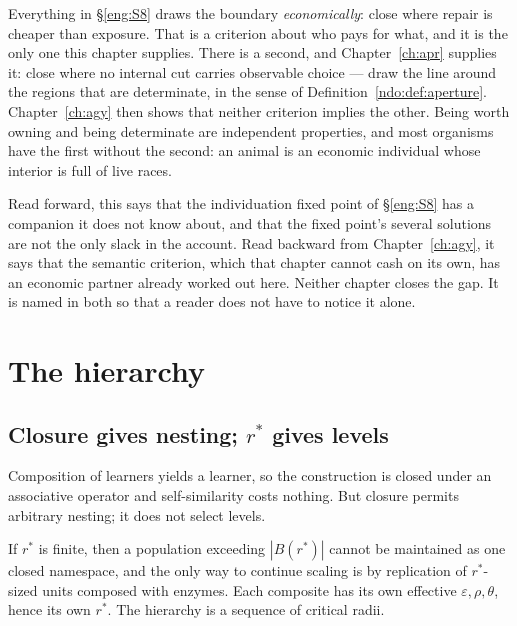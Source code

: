 \begin{remark}
\label{eng:rmk:two-criteria}
Everything in \S\ref{eng:S8} draws the boundary \emph{economically}:
close where repair is cheaper than exposure.
That is a criterion about who pays for what, and it is the only one this
chapter supplies.
There is a second, and Chapter~\ref{ch:apr} supplies it: close where no
internal cut carries observable choice --- draw the line around the
regions that are determinate, in the sense of
Definition~\ref{ndo:def:aperture}.
Chapter~\ref{ch:agy} then shows that neither criterion implies the
other.
Being worth owning and being determinate are independent properties, and
most organisms have the first without the second: an animal is an
economic individual whose interior is full of live races.

Read forward, this says that the individuation fixed point of
\S\ref{eng:S8} has a companion it does not know about, and that the
fixed point's several solutions are not the only slack in the account.
Read backward from Chapter~\ref{ch:agy}, it says that the semantic
criterion, which that chapter cannot cash on its own, has an economic
partner already worked out here.
Neither chapter closes the gap.
It is named in both so that a reader does not have to notice it alone.
\end{remark}

\section{The hierarchy}\label{eng:S9}
\label{eng:sec:hier}

\subsection{Closure gives nesting; $r^\ast$ gives levels}\label{eng:S9.1}

Composition of learners yields a learner, so the construction is closed
under an associative operator and self-similarity costs nothing. But
closure permits arbitrary nesting; it does not select levels.

\begin{proposition}\label{eng:levels-forced-finite-r}
If $r^\ast$ is finite, then a population exceeding $|B(r^\ast)|$ cannot be
maintained as one closed namespace, and the only way to continue scaling is
by replication of $r^\ast$-sized units composed with enzymes. Each
composite has its own effective $\varepsilon, \rho, \theta$, hence its own
$r^\ast$. The hierarchy is a sequence of critical radii.
\end{proposition}

